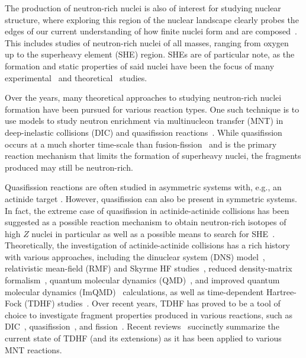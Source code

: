 The production of neutron-rich nuclei is also of interest for studying nuclear structure, where exploring this region of the nuclear landscape clearly probes the edges of our current understanding of how finite nuclei form and are composed~\citep{otsuka2020}. %
This includes studies of neutron-rich nuclei of all masses, ranging from oxygen~\citep{desouza2013} up to the superheavy element (SHE) region.
SHEs are of particular note, as the formation and static properties of said nuclei have been the focus of many experimental~\citep{hofmann2002,munzenberg2015,morita2015,oganessian2015,roberto2015} and theoretical~\citep{bender1999,nazarewicz2002, cwiok2005,pei2009a,stone2019} studies.

Over the years, many theoretical approaches to studying neutron-rich nuclei formation have been pursued for various reaction types.
One such technique is to use models to study neutron enrichment via multinucleon transfer (MNT) in deep-inelastic collisions (DIC) and  quasifission reactions~\citep{adamian2003,zagrebaev2007,umar2008a,golabek2009,aritomo2009,kedziora2010,zhao2016,sekizawa2017a,wu2019}.
While quasifission occurs at a much shorter time-scale than fusion-fission~\citep{toke1985,durietz2011} and is the primary reaction mechanism that limits the formation of superheavy nuclei, the fragments produced may still be neutron-rich.

Quasifission reactions are often studied in asymmetric systems with, e.g., an actinide target \citep{toke1985,hinde1992,hinde1995,itkis2004,wakhle2014}.
However, quasifission can also be present in symmetric systems. In fact, the extreme case of quasifission in
actinide-actinide collisions has been suggested as a possible reaction mechanism to obtain neutron-rich isotopes of high $Z$ nuclei in particular as well as a possible means to search for SHE~\citep{majka2018,wuenschel2018}.
Theoretically, the investigation of actinide-actinide collisions has a rich history with various approaches, including the dinuclear system (DNS) model~\citep{penionzhkevich2005,adamian2008,feng2009a,adamian2010,adamian2010b,feng2017,zhu2017,bao2018b}, relativistic mean-field (RMF) and Skyrme HF studies~\citep{gupta2007b}, reduced density-matrix formalism~\citep{sargsyan2009}, quantum molecular dynamics (QMD)~\citep{zhao2009}, and improved quantum molecular dynamics (ImQMD)~\citep{tian2008,zhao2016,wang2016,yao2017,li2018} calculations, as well as time-dependent Hartree-Fock (TDHF) studies~\citep{cusson1980,golabek2009,kedziora2010}.
Over recent years, TDHF has proved to be a tool of choice to investigate fragment properties produced in various reactions, such as DIC~\citep{umar2017,wu2019},  quasifission~\citep{wakhle2014,oberacker2014,hammerton2015,umar2015c,umar2016,wang2016,sekizawa2017a,godbey2019,jiang2020}, and fission~\citep{simenel2014a,scamps2015a,goddard2015,tanimura2015,goddard2016,bulgac2016,tanimura2017,scamps2018,bulgac2018,scamps2019}.
Recent reviews~\citep{simenel2018,sekizawa2019} succinctly summarize the current state of TDHF (and its extensions) as it has been applied to various MNT reactions.

